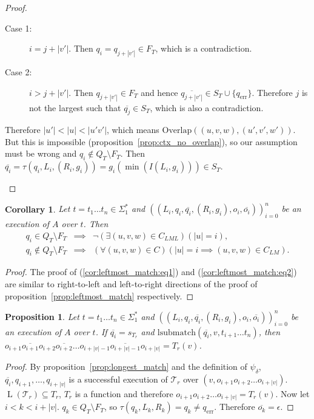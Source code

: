 \documentclass{article}
\newtheorem{proposition}[definition]{Proposition}
\newtheorem{corollary}[definition]{Corollary}
\newcommand{\len}[1]{\ensuremath{\left| #1 \right|}}
\DeclareMathOperator{\Lang}{L}
\begin{document}
\begin{proof}
\begin{description}
				\begin{description}
					\item[Case 1:] $i=j+\len{v'}$. Then $q_i = q_{j+\len{v'}}\in F_T$, which is a contradiction.
					\item[Case 2:] $i>j+\len{v'}$. Then $q_{j+\len{v'}}\in F_T$ and hence $\overline{q_{j+\len{v'}}}\in S_T\cup\{q_{\mathrm{err}}\}$. Therefore $j$ is not the largest such that $\overline{q_j}\in S_T$, which is also a contradiction.
				\end{description}
				Therefore $\len{u'} < \len{u} < \len{u'v'}$, which means $\mathrm{Overlap}((u, v, w), (u', v', w'))$.
				But this is impossible (proposition~\ref{prop:ctx_no_overlap}), so our assumption must be wrong and $q_i\notin Q_T\setminus F_T$. Then $\overline{q_i} = \tau(q_i, L_i, (R_i, g_i)) = g_i(\min(I(L_i, g_i)))\in S_T$.
		\end{description}
	\end{proof}
	\begin{corollary} \label{cor:leftmost_match}
		Let $t=t_1\ldots t_n\in \Sigma_1^*$ and $((L_i, q_i, \overline{q_i}, (R_i, g_i), o_i, \overline{o_i}))_{i=0}^n$ be an execution of $A$ over $t$. Then
		\begin{eqnarray}
			q_i\in Q_T\setminus F_T & \implies & \lnot(\exists (u, v, w)\in C_{LML})(\len{u}=i), \label{cor:leftmost_match:eq1} \\
			q_i\notin Q_T\setminus F_T & \implies & (\forall (u, v, w)\in C)(\len{u} = i \implies (u, v, w)\in C_{LM}) \label{cor:leftmost_match:eq2}.
		\end{eqnarray}
	\end{corollary}
	\begin{proof}
		The proof of (\ref{cor:leftmost_match:eq1}) and (\ref{cor:leftmost_match:eq2}) are similar to right-to-left and left-to-right directions of the proof of proposition~\ref{prop:leftmost_match} respectively.
	\end{proof}

	\begin{proposition} \label{prop:longest_match_output}
		Let $t=t_1\ldots t_n\in \Sigma_1^*$ and $((L_i, q_i, \overline{q_i}, (R_i, g_i), o_i, \overline{o_i}))_{i=0}^n$ be an execution of $A$ over $t$. If $\overline{q_i} = s_{T_r}$ and $\mathrm{lsubmatch}(\overline{q_i}, v, t_{i+1}\ldots t_n)$,
		then $o_{i+1}\overline{o_{i+1}}o_{i+2}\overline{o_{i+2}}\ldots o_{i+\len{v}-1}\overline{o_{i+\len{v}-1}}o_{i+\len{v}} = T_r(v)$.
	\end{proposition}
	\begin{proof}
		By proposition~\ref{prop:longest_match} and the definition of $\psi_\delta$, $\overline{q_i}, q_{i+1}, \ldots, q_{i+\len{v}}$ is a successful execution of $\mathcal{T}_r$ over $(v, o_{i+1}o_{i+2}\ldots o_{i+\len{v}})$. $\Lang(\mathcal{T}_r)\subseteq T_r$,
		$T_r$ is a function and therefore $o_{i+1}o_{i+2}\ldots o_{i+\len{v}} = T_r(v)$.
		Now let $i < k < i+\len{v}$. $q_k\in Q_T\setminus F_T$, so $\tau(q_k, L_k, R_k) = q_k\ne q_\mathrm{err}$. Therefore $\overline{o_k} = \epsilon$.
	\end{proof}
\end{document}
